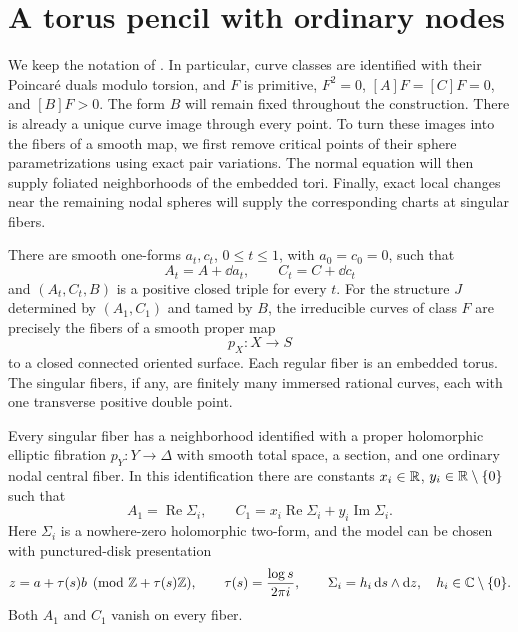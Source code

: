 \section{A torus pencil with ordinary nodes}\label{sec:pencil}

We keep the notation of .  In particular, curve
classes are identified with their Poincar\'e duals modulo torsion, and
$F$ is primitive, $F^2=0$, $[A]F=[C]F=0$, and $[B]F>0$.
The form $B$ will remain fixed throughout the construction.
There is already a unique curve image through every point.  To turn
these images into the fibers of a smooth map, we first remove critical
points of their sphere parametrizations using exact pair variations.
The normal equation will then supply foliated neighborhoods of the
embedded tori.  Finally, exact local changes near the remaining nodal
spheres will supply the corresponding charts at singular fibers.

\begin{theorem}\label{thm:pencil}
There are smooth one-forms $a_t,c_t$, $0\leq t\leq1$, with
$a_0=c_0=0$, such that
\[
 A_t=A+\dd a_t,\qquad C_t=C+\dd c_t
\]
and $(A_t,C_t,B)$ is a positive closed triple for every $t$.
For the structure $J$ determined by $(A_1,C_1)$ and tamed by $B$, the
irreducible curves of class $F$ are precisely the fibers of a smooth
proper map
\[
 p_X:X\longrightarrow S
\]
to a closed connected oriented surface.  Each regular fiber is an
embedded torus.  The singular fibers, if any, are finitely many immersed
rational curves, each with one transverse positive double point.

Every singular fiber has a neighborhood identified with a proper
holomorphic elliptic fibration $p_Y:Y\to\Delta$ with smooth total space,
a section, and one ordinary nodal central fiber.  In this identification
there are constants $x_i\in\mathbb R$, $y_i\in\mathbb R\setminus\{0\}$ such that
\begin{equation}\label{eq:pencil-model-pair}
 A_1=\operatorname{Re}\Sigma_i,\qquad
 C_1=x_i\operatorname{Re}\Sigma_i+y_i\operatorname{Im}\Sigma_i.
\end{equation}
Here $\Sigma_i$ is a nowhere-zero holomorphic two-form, and the model
can be chosen with punctured-disk presentation
\begin{equation}\label{eq:pencil-model-periods}
 z=a+\tau(s)b\pmod{\mathbb Z+\tau(s)\mathbb Z},\qquad
 \tau(s)=\frac{\log s}{2\pi i},\qquad
 \Sigma_i=h_i\,\mathrm d s\wedge\mathrm d z,
 \quad h_i\in\mathbb C\setminus\{0\}.
\end{equation}
Both $A_1$ and $C_1$ vanish on every fiber.
\end{theorem}

